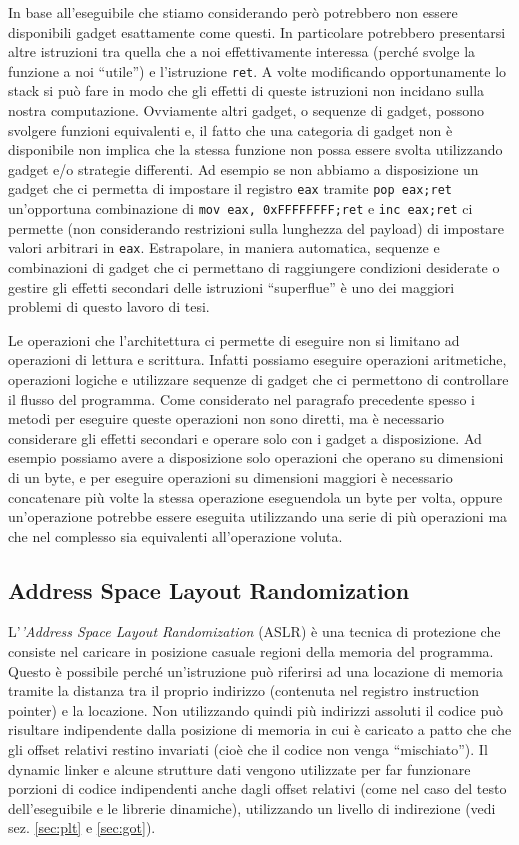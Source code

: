 In base all'eseguibile che stiamo considerando però potrebbero non
essere disponibili gadget esattamente come questi.  In particolare
potrebbero presentarsi altre istruzioni tra quella che a noi
effettivamente interessa (perché svolge la funzione a noi ``utile'') e
l'istruzione \lstinline{ret}. A volte modificando opportunamente lo
stack si può fare in modo che gli effetti di queste istruzioni non
incidano sulla nostra computazione. Ovviamente altri gadget, o
sequenze di gadget, possono svolgere funzioni equivalenti e, il fatto
che una categoria di gadget non è disponibile non implica che la
stessa funzione non possa essere svolta utilizzando gadget e/o
strategie differenti. Ad esempio se non abbiamo a disposizione un
gadget che ci permetta di impostare il registro \lstinline{eax}
tramite \lstinline{pop eax;ret} un'opportuna combinazione di
\lstinline{mov eax, 0xFFFFFFFF;ret} e \lstinline{inc eax;ret} ci
permette (non considerando restrizioni sulla lunghezza del payload) di
impostare valori arbitrari in \lstinline{eax}. Estrapolare, in maniera
automatica, sequenze e combinazioni di gadget che ci permettano di
raggiungere condizioni desiderate o gestire gli effetti secondari
delle istruzioni ``superflue'' è uno dei maggiori problemi di questo
lavoro di tesi.

Le operazioni che l'architettura ci permette di eseguire non si
limitano ad operazioni di lettura e scrittura. Infatti possiamo
eseguire operazioni aritmetiche, operazioni logiche e utilizzare
sequenze di gadget che ci permettono di controllare il flusso del
programma. Come considerato nel paragrafo precedente spesso i metodi
per eseguire queste operazioni non sono diretti, ma è necessario
considerare gli effetti secondari e operare solo con i gadget a
disposizione. Ad esempio possiamo avere a disposizione solo operazioni
che operano su dimensioni di un byte, e per eseguire operazioni su
dimensioni maggiori è necessario concatenare più volte la stessa
operazione eseguendola un byte per volta, oppure un'operazione
potrebbe essere eseguita utilizzando una serie di più operazioni ma
che nel complesso sia equivalenti all'operazione voluta.

\subsection{Address Space Layout Randomization}

L'\emph{'Address Space Layout Randomization} (ASLR) è una tecnica di
protezione che consiste nel caricare in posizione casuale regioni
della memoria del programma. Questo è possibile perché un'istruzione
può riferirsi ad una locazione di memoria tramite la distanza tra il
proprio indirizzo (contenuta nel registro instruction pointer) e la
locazione. Non utilizzando quindi più indirizzi assoluti il codice può
risultare indipendente dalla posizione di memoria in cui è caricato a
patto che che gli offset relativi restino invariati (cioè che il
codice non venga ``mischiato''). Il dynamic linker e alcune strutture
dati vengono utilizzate per far funzionare porzioni di codice
indipendenti anche dagli offset relativi (come nel caso del testo
dell'eseguibile e le librerie dinamiche), utilizzando un livello di
indirezione (vedi sez. \ref{sec:plt} e \ref{sec:got}).

